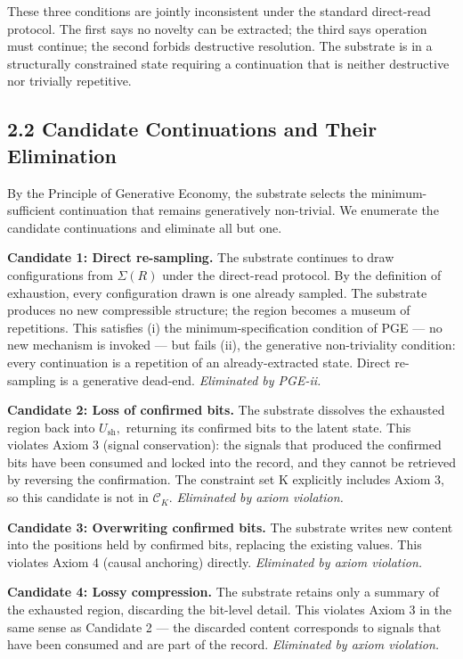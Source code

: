\documentclass[11pt,oneside]{report}
\theoremstyle{definition}
\theoremstyle{remark}
\begin{document}
These three conditions are jointly inconsistent under the standard
direct-read protocol. The first says no novelty can be extracted; the
third says operation must continue; the second forbids destructive
resolution. The substrate is in a structurally constrained state
requiring a continuation that is neither destructive nor trivially
repetitive.

\subsection*{2.2 Candidate Continuations and Their Elimination}

By the Principle of Generative Economy, the substrate selects the
minimum-sufficient continuation that remains generatively non-trivial.
We enumerate the candidate continuations and eliminate all but one.

\textbf{Candidate 1: Direct re-sampling.} The substrate continues to
draw configurations from \ensuremath{\Sigma (R)} under the direct-read protocol. By the
definition of exhaustion, every configuration drawn is one already
sampled. The substrate produces no new compressible structure; the
region becomes a museum of repetitions. This satisfies (i) the
minimum-specification condition of PGE --- no new mechanism is invoked
--- but fails (ii), the generative non-triviality condition: every
continuation is a repetition of an already-extracted state. Direct
re-sampling is a generative dead-end. \emph{Eliminated by PGE-ii.}

\textbf{Candidate 2: Loss of confirmed bits.} The substrate dissolves
the exhausted region back into \ensuremath{U_{\mathrm{sh}},} returning its confirmed bits to the
latent state. This violates Axiom 3 (signal conservation): the signals
that produced the confirmed bits have been consumed and locked into the
record, and they cannot be retrieved by reversing the confirmation. The
constraint set K explicitly includes Axiom 3, so this candidate is not
in \ensuremath{\mathcal{C}_{K}.} \emph{Eliminated by axiom violation.}

\textbf{Candidate 3: Overwriting confirmed bits.} The substrate writes
new content into the positions held by confirmed bits, replacing the
existing values. This violates Axiom 4 (causal anchoring) directly.
\emph{Eliminated by axiom violation.}

\textbf{Candidate 4: Lossy compression.} The substrate retains only a
summary of the exhausted region, discarding the bit-level detail. This
violates Axiom 3 in the same sense as Candidate 2 --- the discarded
content corresponds to signals that have been consumed and are part of
the record. \emph{Eliminated by axiom violation.}
\end{document}
